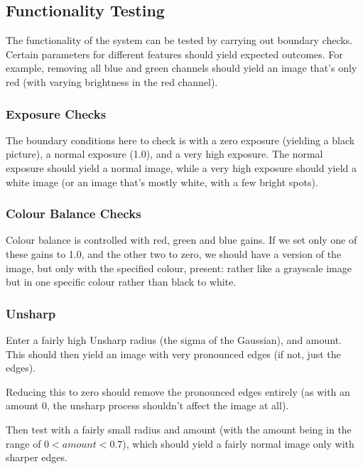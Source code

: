 \documentclass[11pt,a4paper]{article}
\begin{document}
\subsection{Functionality Testing}
The functionality of the system can be tested by carrying out boundary checks. Certain parameters for different features should yield 
expected outcomes. For example, removing all blue and green channels should yield an image that's only red (with varying brightness in the red channel).

\subsubsection{Exposure Checks}
The boundary conditions here to check is with a zero exposure (yielding a black picture), a normal exposure (1.0), and a very high exposure.
The normal exposure should yield a normal image, while a very high exposure should yield a white image (or an image that's mostly white, with a few
bright spots).


\subsubsection{Colour Balance Checks}
Colour balance is controlled with red, green and blue gains. If we set only one of these gains to 1.0, and the other two to zero, we should
have a version of the image, but only with the specified colour, present: rather like a grayscale image but in one specific colour rather than black to white.


\subsubsection{Unsharp}
Enter a fairly high Unsharp radius (the sigma of the Gaussian), and amount. This should then yield an image with very pronounced edges (if not, just the edges).

Reducing this to zero should remove the pronounced edges entirely (as with an amount 0, the unsharp process shouldn't affect the image at all).

Then test with a fairly small radius and amount (with the amount being in the range of $0 < amount < 0.7$), which should yield a fairly normal image only with sharper
edges.
\end{document}
